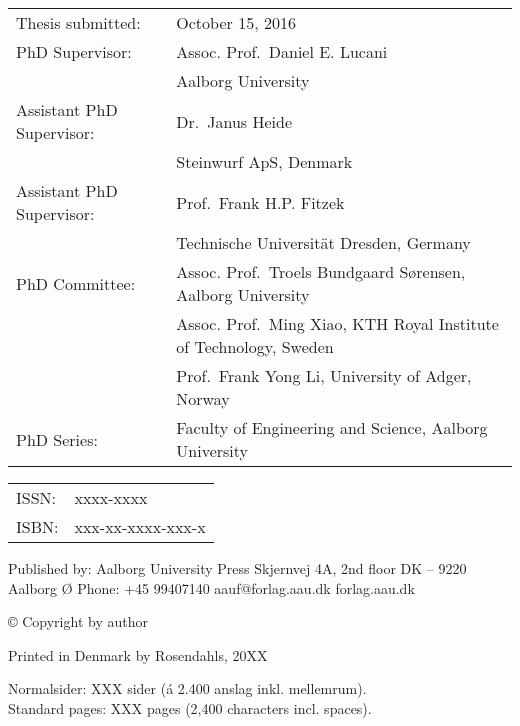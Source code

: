 \thispagestyle{empty}
\noindent
\begin{tabularx}{\textwidth}{@{}lX}
    Thesis submitted: & October 15, 2016\\
    PhD Supervisor: & Assoc. Prof.\ Daniel E. Lucani\\
                    & Aalborg University\\
    Assistant PhD Supervisor: & Dr.\ Janus Heide\\
                    & Steinwurf ApS, Denmark\\
    Assistant PhD Supervisor: & Prof.\ Frank H.P. Fitzek\\
                    & Technische Universit\"{a}t Dresden, Germany\\
    PhD Committee: & Assoc. Prof.\ Troels Bundgaard S\o rensen, Aalborg University\\
                   & Assoc. Prof.\ Ming Xiao, KTH Royal Institute of Technology, Sweden\\
                   & Prof.\ Frank Yong Li, University of Adger, Norway\\
    PhD Series:    & Faculty of Engineering and Science, Aalborg University\\
\end{tabularx}
\strut\vfill
\noindent
\begin{tabularx}{\textwidth}{@{}lX}
    ISSN: & xxxx-xxxx\\
    ISBN: & xxx-xx-xxxx-xxx-x\\
\end{tabularx}
\strut\vfill
\noindent Published by:\newline
Aalborg University Press\newline
Skjernvej 4A, 2nd floor\newline
DK – 9220 Aalborg Ø\newline
Phone: +45 99407140\newline
aauf@forlag.aau.dk\newline
forlag.aau.dk
\strut\vfill
\noindent \copyright{} Copyright by author\newline
\strut\vfill
\noindent Printed in Denmark by Rosendahls, 20XX
\strut\vfill\vfill\vfill
\noindent Normalsider: XXX sider (á 2.400 anslag inkl. mellemrum).\\
Standard pages: XXX pages (2,400 characters incl. spaces).
\clearpage


